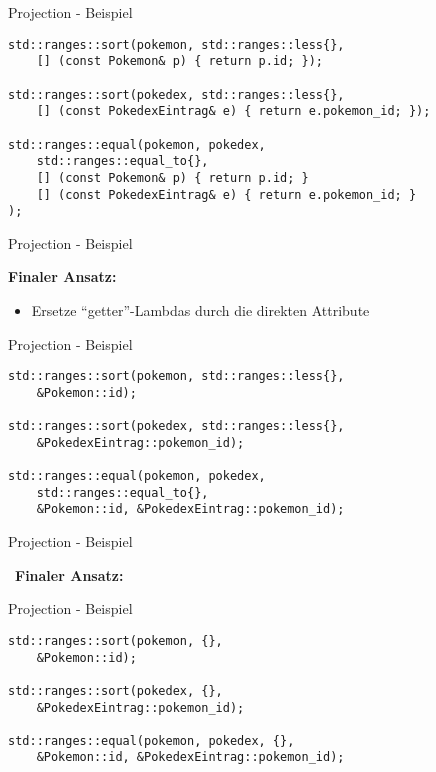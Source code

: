 \begin{frame}[fragile]{Projection - Beispiel}
    \begin{verbatim}
std::ranges::sort(pokemon, std::ranges::less{},
    [] (const Pokemon& p) { return p.id; });

std::ranges::sort(pokedex, std::ranges::less{},
    [] (const PokedexEintrag& e) { return e.pokemon_id; });

std::ranges::equal(pokemon, pokedex,
    std::ranges::equal_to{},
    [] (const Pokemon& p) { return p.id; }
    [] (const PokedexEintrag& e) { return e.pokemon_id; }
);
    \end{verbatim}
\end{frame}

\begin{frame}{Projection - Beispiel}
    \begin{center}
        \textbf{Finaler Ansatz:}
    \end{center}

    \begin{itemize}
        \item Ersetze \enquote{getter}-Lambdas durch die direkten Attribute
    \end{itemize}
\end{frame}

\begin{frame}[fragile]{Projection - Beispiel}
    \begin{verbatim}
std::ranges::sort(pokemon, std::ranges::less{},
    &Pokemon::id);

std::ranges::sort(pokedex, std::ranges::less{},
    &PokedexEintrag::pokemon_id);

std::ranges::equal(pokemon, pokedex,
    std::ranges::equal_to{},
    &Pokemon::id, &PokedexEintrag::pokemon_id);
    \end{verbatim}
\end{frame}

\begin{frame}{Projection - Beispiel}
    \begin{center}
        \SixStar \ \textbf{Finaler Ansatz:} \SixStar
    \end{center}
\end{frame}

\begin{frame}[fragile]{Projection - Beispiel}
    \begin{verbatim}
std::ranges::sort(pokemon, {},
    &Pokemon::id);

std::ranges::sort(pokedex, {},
    &PokedexEintrag::pokemon_id);

std::ranges::equal(pokemon, pokedex, {},
    &Pokemon::id, &PokedexEintrag::pokemon_id);
    \end{verbatim}
\end{frame}